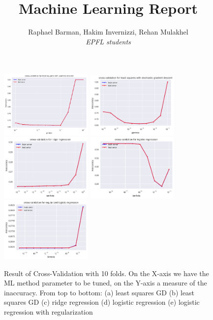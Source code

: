 \documentclass[10pt,conference,compsocconf]{IEEEtran}
\begin{document}
\title{Machine Learning Report}

\author{
  Raphael Barman, Hakim Invernizzi, Rehan Mulakhel\\
  \textit{EPFL students}
}

\maketitle

\begin{figure}
\begin{center}
\includegraphics[width=4.5cm]{cross_validation_least_squares_GD.png}
\includegraphics[width=4.5cm]{cross_validation_least_squares_SGD.png}
\includegraphics[width=4.5cm]{cross_validation_ridge_regression.png}
\includegraphics[width=4.5cm]{cross_validation_logistic_regression.png}
\includegraphics[width=4.5cm]{cross_validation_reg_logistic_regression.png}
 \end{center}
 \begin{center}
 \caption{\label{fig:figure1}Result of Cross-Validation with 10 folds. On the X-axis we have the ML method parameter to be tuned, on the Y-axis a measure of the inaccuracy. From top to bottom: (a) least squares GD (b) least squares GD (c) ridge regression (d) logistic regression (e) logistic regression with regularization}
 \end{center}
\end{figure}
\end{document}
